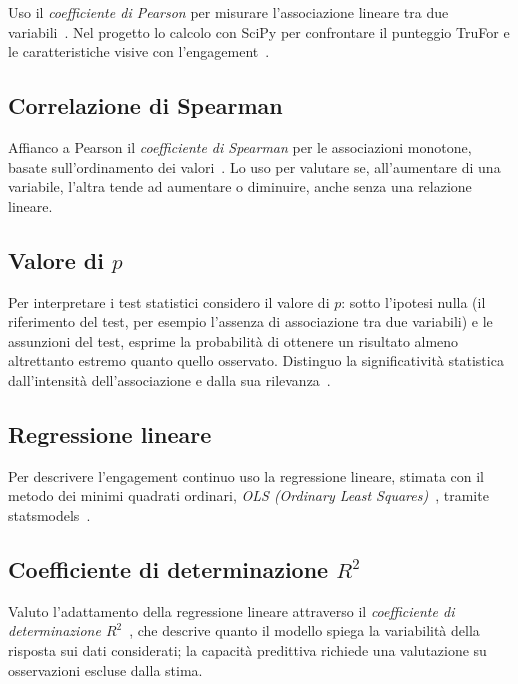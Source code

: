 Uso il \emph{coefficiente di Pearson} per misurare l'associazione lineare tra due variabili~\cite{10.1098/rspl.1895.0041}. Nel progetto lo calcolo con SciPy per confrontare il punteggio TruFor e le caratteristiche visive con l'engagement~\cite{2020SciPy-NMeth}.

\subsection{Correlazione di Spearman}
\label{subsec:background-spearman}

Affianco a Pearson il \emph{coefficiente di Spearman} per le associazioni monotone, basate sull'ordinamento dei valori~\cite{ca468a70-0be4-389a-b0b9-5dd1ff52b33f}. Lo uso per valutare se, all'aumentare di una variabile, l'altra tende ad aumentare o diminuire, anche senza una relazione lineare.

\subsection{Valore di \texorpdfstring{$p$}{p}}
\label{subsec:background-p-value}

Per interpretare i test statistici considero il valore di \emph{$p$}: sotto l'ipotesi nulla (il riferimento del test, per esempio l'assenza di associazione tra due variabili) e le assunzioni del test, esprime la probabilità di ottenere un risultato almeno altrettanto estremo quanto quello osservato. Distinguo la significatività statistica dall'intensità dell'associazione e dalla sua rilevanza~\cite{Wasserstein02042016}.

\subsection{Regressione lineare}
\label{subsec:background-ols}

Per descrivere l'engagement continuo uso la regressione lineare, stimata con il metodo dei minimi quadrati ordinari, \emph{OLS (Ordinary Least Squares)}~\cite{James2013}, tramite statsmodels~\cite{josef_perktold_2024_10984387}.

\subsection{Coefficiente di determinazione \texorpdfstring{$R^2$}{R2}}
\label{subsec:background-r-quadro}

Valuto l'adattamento della regressione lineare attraverso il \emph{coefficiente di determinazione $R^2$}~\cite{James2013}, che descrive quanto il modello spiega la variabilità della risposta sui dati considerati; la capacità predittiva richiede una valutazione su osservazioni escluse dalla stima.

